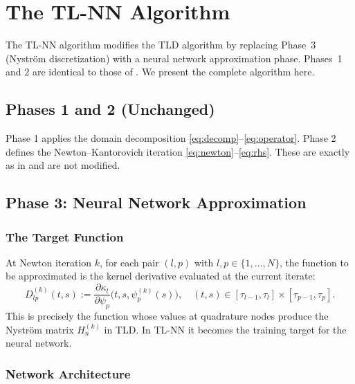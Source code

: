 \documentclass[12pt, a4paper]{article}
\newcommand{\Hn}{H_{n}^{(k)}}
\begin{document}
\section{The TL-NN Algorithm}
\label{sec:tlnn}

The TL-NN algorithm modifies the TLD algorithm by replacing
Phase~3 (Nystr\"{o}m discretization) with a neural network
approximation phase.
Phases~1 and 2 are identical to those of \cite{sedka2025}.
We present the complete algorithm here.

\subsection{Phases 1 and 2 (Unchanged)}

Phase 1 applies the domain decomposition
\eqref{eq:decomp}--\eqref{eq:operator}.
Phase 2 defines the Newton--Kantorovich iteration
\eqref{eq:newton}--\eqref{eq:rhs}.
These are exactly as in \cite{sedka2025} and are not modified.

\subsection{Phase 3: Neural Network Approximation}

\subsubsection{The Target Function}

At Newton iteration $k$, for each pair $(l, p)$ with
$l, p \in \{1, \ldots, N\}$, the function to be approximated
is the kernel derivative evaluated at the current iterate:
\begin{equation}
  D_{lp}^{(k)}(t, s) :=
  \frac{\partial \kappa_l}{\partial \psi_p}
  \bigl(t, s, \psi_p^{(k)}(s)\bigr),
  \quad
  (t, s) \in [\tau_{l-1}, \tau_l] \times [\tau_{p-1}, \tau_p].
  \label{eq:target}
\end{equation}
This is precisely the function whose values at quadrature
nodes produce the Nystr\"{o}m matrix $\Hn$ in TLD.
In TL-NN it becomes the training target for the neural
network.

\subsubsection{Network Architecture}
\end{document}
